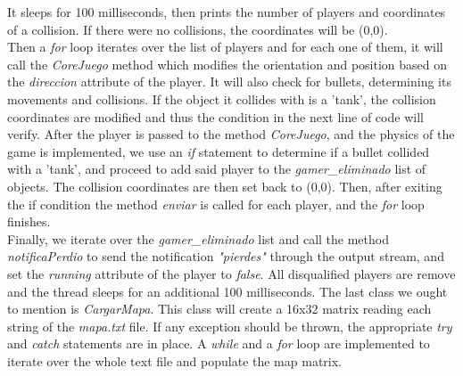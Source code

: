 \documentclass[10pt,a4paper]{article}
\theoremstyle{definition}
\begin{document}
It sleeps for 100 milliseconds, then prints the number of players and coordinates of a collision. 
If there were no collisions, the coordinates will be (0,0). \\
Then a \textit{for} loop iterates over the list of players and for each one of them, it will call the \textit{CoreJuego} method which modifies the orientation and position based on the \textit{direccion} attribute of the player. 
It will also check for bullets, determining its movements and collisions. 
If the object it collides with is a 'tank', the collision coordinates are modified and thus the condition in the next line of code will verify.
After the player is passed to the method \textit{CoreJuego}, and the physics of the game is implemented, we use an \textit{if} statement to determine if a bullet collided with a 'tank', and proceed to add said player to the \textit{gamer\_eliminado} list of objects. 
The collision coordinates are then set back to (0,0). 
Then, after exiting the if condition the method \textit{enviar} is called for each player, and the \textit{for} loop finishes. \\
Finally, we iterate over the \textit{gamer\_eliminado} list and call the method \textit{notificaPerdio} to send the notification \textit{"pierdes"} through the output stream, and set the \textit{running} attribute of the player to \textit{false}. 
All disqualified players are remove and the thread sleeps for an additional 100 milliseconds.
The last class we ought to mention is \textit{CargarMapa}. 
This class will create a 16x32 matrix reading each string of the \textit{mapa.txt} file. 
If any exception should be thrown, the appropriate \textit{try} and \textit{catch} statements are in place. 
A \textit{while} and a \textit{for} loop are implemented to iterate over the whole text file and populate the map matrix.
\end{document}
